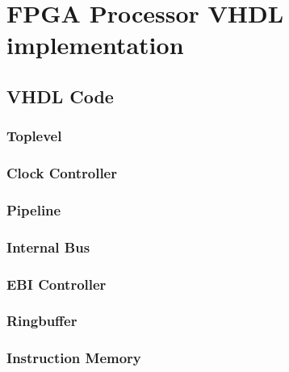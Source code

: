 \chapter{FPGA Processor VHDL implementation}
\section{VHDL Code}

\clearpage
\subsection{Toplevel}\label{vhdl:toplevel}


\clearpage
\subsection{Clock Controller}\label{vhdl:clkcntrl}


\clearpage
\subsection{Pipeline}\label{vhdl:pipeline}


\clearpage
\subsection{Internal Bus}\label{vhdl:internal-bus}


\clearpage
\subsection{EBI Controller}\label{vhdl:ebi-controller}


\clearpage
\subsection{Ringbuffer}\label{vhdl:ringbuffer}


\clearpage
\subsection{Instruction Memory}\label{vhdl:instruction-memory}


